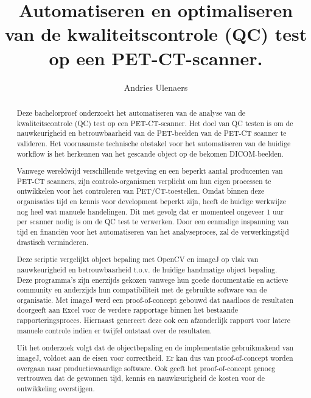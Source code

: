 \documentclass{hogent-article}
\title{Automatiseren en optimaliseren van de kwaliteitscontrole (QC) test op een PET-CT-scanner.}
\author{Andries Ulenaers}
\begin{document}
\begin{abstract}
    
 Deze bachelorproef onderzoekt het automatiseren van de analyse van de kwaliteitscontrole (QC) test op een PET-CT-scanner.  Het doel van QC testen is om de nauwkeurigheid en betrouwbaarheid van de PET-beelden van de PET-CT scanner te valideren. Het voornaamste technische obstakel voor het automatiseren van de huidige workflow is het herkennen van het gescande object op de bekomen DICOM-beelden. \medskip
 
 Vanwege wereldwijd verschillende wetgeving en een beperkt aantal producenten van PET-CT scanners, zijn controle-organismen verplicht om hun eigen processen te ontwikkelen voor het controleren van PET/CT-toestellen. Omdat binnen deze organisaties tijd en kennis voor development beperkt zijn, heeft de huidige werkwijze nog heel wat manuele handelingen. Dit met gevolg dat er momenteel ongeveer 1 uur per scanner nodig is om de QC test te verwerken. Door een eenmalige inspanning van tijd en financiën voor het automatiseren van het analyseproces, zal de verwerkingstijd drastisch verminderen.\medskip
 
 Deze scriptie vergelijkt object bepaling met OpenCV en imageJ op vlak van nauwkeurigheid en betrouwbaarheid t.o.v. de huidige handmatige object bepaling. Deze programma’s zijn enerzijds gekozen vanwege hun goede documentatie en actieve community en anderzijds hun compatibiliteit met de gebruikte software van de organisatie. Met imageJ werd een proof-of-concept gebouwd dat naadloos de resultaten doorgeeft aan Excel voor de verdere rapportage binnen het bestaande rapporteringsproces. Hiernaast genereert deze ook een afzonderlijk rapport voor latere manuele controle indien er twijfel ontstaat over de resultaten.\medskip
 
 Uit het onderzoek volgt dat de objectbepaling en de implementatie gebruikmakend van imageJ, voldoet aan de eisen voor correctheid. Er kan dus van proof-of-concept worden overgaan naar productiewaardige software. Ook geeft het proof-of-concept genoeg vertrouwen dat de gewonnen tijd, kennis en nauwkeurigheid de kosten voor de ontwikkeling overstijgen.\medskip
 
  
\end{abstract}



\tableofcontents

\bigskip

\end{document}
